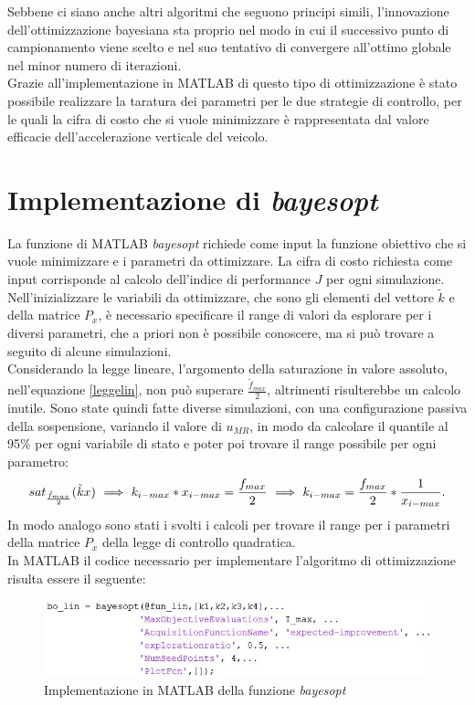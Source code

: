 Sebbene ci siano anche altri algoritmi che seguono principi simili, l'innovazione dell'ottimizzazione bayesiana sta proprio nel modo in cui il successivo punto di campionamento viene scelto e nel suo tentativo di convergere all'ottimo globale nel minor numero di iterazioni.\\
Grazie all'implementazione in MATLAB di questo tipo di ottimizzazione è stato possibile realizzare la taratura dei parametri per le due strategie di controllo, per le quali la cifra di costo che si vuole minimizzare è rappresentata dal valore efficacie dell'accelerazione verticale del veicolo. 

\section{Implementazione di \textit{bayesopt}}
La funzione di MATLAB \textit{bayesopt} richiede come input la funzione obiettivo che si vuole minimizzare e i parametri da ottimizzare. La cifra di costo richiesta come input corrisponde al calcolo dell'indice di performance $J$ per ogni simulazione. Nell'inizializzare le variabili da ottimizzare, che sono gli elementi del vettore $\tilde{k}$ e della matrice $P_x$, è necessario specificare il range di valori da esplorare per i diversi parametri, che a priori non è possibile conoscere, ma si può trovare a seguito di alcune simulazioni.\\
Considerando la legge lineare, l'argomento della saturazione in valore assoluto, nell'equazione \eqref{leggelin}, non può superare $\frac{\tilde{f}_{max}}{2}$, altrimenti risulterebbe un calcolo inutile. Sono state quindi fatte diverse simulazioni, con una configurazione passiva della sospensione, variando il valore di $u_{MR}$, in modo da calcolare il quantile al 95\% per ogni variabile di stato e poter poi trovare il range possibile per ogni parametro:
\begin{equation}
	\centering
	sat_{\frac{\tilde{f}_{max}}{2}}(\tilde{k}x) \  \Longrightarrow \  k_{i-max}*x_{i-max} = \frac{f_{max}}{2} \  \Longrightarrow \  k_{i-max} = \frac{f_{max}}{2}*\frac{1}{x_{i-max}}.
	\label{rangeparametri}
\end{equation}
In modo analogo sono stati i svolti i calcoli per trovare il range per i parametri della matrice $P_x$ della legge di controllo quadratica.\\

In MATLAB il codice necessario per implementare l'algoritmo di ottimizzazione risulta essere il seguente:
\begin{figure}[htb]
	\centering
	\includegraphics[scale=0.7]{figure/BOlin.jpg}
	\caption{Implementazione in MATLAB della funzione \textit{bayesopt}}
	\label{fig:bayesopt}
\end{figure}

